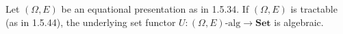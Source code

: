 Let $(\Omega, E)$ be an equational presentation as in 1.5.34. If $(\Omega, E)$ is tractable (as in 1.5.44), the underlying set functor $U: (\Omega, E)\text{-alg} \rightarrow \mathbf{Set}$ is algebraic.
